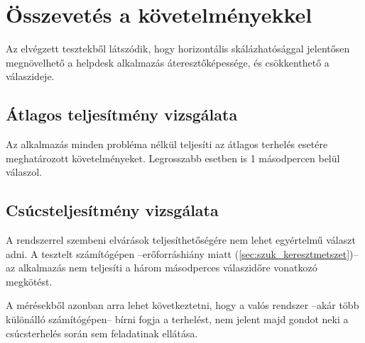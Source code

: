 \pagebreak

\section{Összevetés a követelményekkel}
Az elvégzett tesztekből látszódik, hogy horizontális skálázhatósággal jelentősen megnövelhető a helpdesk alkalmazás áteresztőképessége, és csökkenthető a válaszideje.

\subsection{Átlagos teljesítmény vizsgálata}
Az alkalmazás minden probléma nélkül teljesíti az átlagos terhelés esetére meghatározott követelményeket. Legrosszabb esetben is 1 másodpercen belül válaszol.

\subsection{Csúcsteljesítmény vizsgálata}
A rendszerrel szembeni elvárások teljesíthetőségére nem lehet egyértelmű választ adni. A tesztelt számítógépen --erőforráshiány miatt (\ref{sec:szuk_keresztmetszet})-- az alkalmazás nem teljesíti a három másodperces válaszidőre vonatkozó megkötést.

A mérésekből azonban arra lehet következtetni, hogy a valós rendszer --akár több különálló számítógépen-- bírni fogja a terhelést, nem jelent majd gondot neki a csúcsterhelés során sem feladatinak ellátása.



